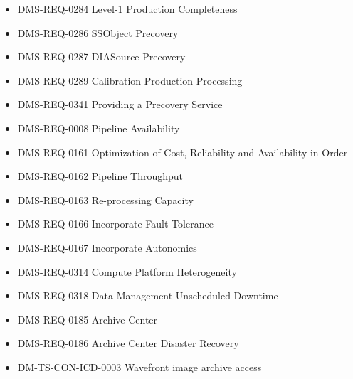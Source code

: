 \begin{itemize}
\item DMS-REQ-0284 Level-1 Production Completeness
\item DMS-REQ-0286 SSObject Precovery
\item DMS-REQ-0287 DIASource Precovery
\item DMS-REQ-0289 Calibration Production Processing
\item DMS-REQ-0341 Providing a Precovery Service
\item DMS-REQ-0008 Pipeline Availability
\item DMS-REQ-0161 Optimization of Cost, Reliability and Availability in Order
\item DMS-REQ-0162 Pipeline Throughput
\item DMS-REQ-0163 Re-processing Capacity
\item DMS-REQ-0166 Incorporate Fault-Tolerance
\item DMS-REQ-0167 Incorporate Autonomics
\item DMS-REQ-0314 Compute Platform Heterogeneity
\item DMS-REQ-0318 Data Management Unscheduled Downtime
\item DMS-REQ-0185 Archive Center
\item DMS-REQ-0186 Archive Center Disaster Recovery
\item DM-TS-CON-ICD-0003 Wavefront image archive access
\end{itemize}
